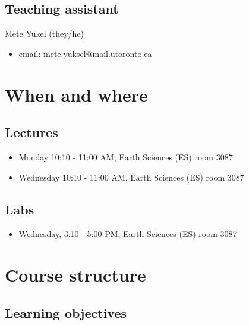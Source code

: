 \documentclass[
]{article}
\providecommand{\tightlist}{%
  \setlength{\itemsep}{0pt}\setlength{\parskip}{0pt}}
\begin{document}
\hypertarget{teaching-assistant}{%
\subsection{Teaching assistant}\label{teaching-assistant}}

Mete Yukel (they/he)

\begin{itemize}
\tightlist
\item
  email: mete.yuksel@mail.utoronto.ca
\end{itemize}

\hypertarget{when-and-where}{%
\section{When and where}\label{when-and-where}}

\hypertarget{lectures}{%
\subsection{Lectures}\label{lectures}}

\begin{itemize}
\tightlist
\item
  Monday 10:10 - 11:00 AM, Earth Sciences (ES) room 3087
\item
  Wednesday 10:10 - 11:00 AM, Earth Sciences (ES) room 3087
\end{itemize}

\hypertarget{labs}{%
\subsection{Labs}\label{labs}}

\begin{itemize}
\tightlist
\item
  Wednesday, 3:10 - 5:00 PM, Earth Sciences (ES) room 3087
\end{itemize}

\hypertarget{course-structure}{%
\section{Course structure}\label{course-structure}}

\hypertarget{learning-objectives}{%
\subsection{Learning objectives}\label{learning-objectives}}
\end{document}
